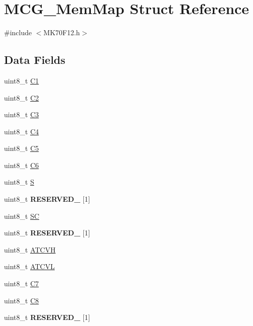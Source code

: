\hypertarget{struct_m_c_g___mem_map}{}\section{M\+C\+G\+\_\+\+Mem\+Map Struct Reference}
\label{struct_m_c_g___mem_map}


{\ttfamily \#include $<$M\+K70\+F12.\+h$>$}

\subsection*{Data Fields}
\begin{DoxyCompactItemize}
\item 
uint8\+\_\+t \hyperlink{struct_m_c_g___mem_map_a433a36d1aeb9d033b502ee263c1495a1}{C1}
\item 
uint8\+\_\+t \hyperlink{struct_m_c_g___mem_map_a7323696b9a1cb6631b8c04ffad3947e5}{C2}
\item 
uint8\+\_\+t \hyperlink{struct_m_c_g___mem_map_a58ca70b30279c98af3471abe38280f01}{C3}
\item 
uint8\+\_\+t \hyperlink{struct_m_c_g___mem_map_a3c5615d70ed3f2d3664de1a8fdbe9983}{C4}
\item 
uint8\+\_\+t \hyperlink{struct_m_c_g___mem_map_a0e385950fe0f38c82eae57eb4ea2aaf3}{C5}
\item 
uint8\+\_\+t \hyperlink{struct_m_c_g___mem_map_ae7f9f9ae65de91e230a236ca4629380c}{C6}
\item 
uint8\+\_\+t \hyperlink{struct_m_c_g___mem_map_a65ee0333e0d5c462c7dd8c2402bf93be}{S}
\item 
\hypertarget{struct_m_c_g___mem_map_a4a2bbf23e6c51743e808ba42e79d6128}{}uint8\+\_\+t {\bfseries R\+E\+S\+E\+R\+V\+E\+D\+\_} \mbox{[}1\mbox{]}\label{struct_m_c_g___mem_map_a4a2bbf23e6c51743e808ba42e79d6128}

\item 
uint8\+\_\+t \hyperlink{struct_m_c_g___mem_map_aeff584aa52340d7c66dc06789ad05310}{S\+C}
\item 
\hypertarget{struct_m_c_g___mem_map_a612b54d367d5589e35fd249f6335f85c}{}uint8\+\_\+t {\bfseries R\+E\+S\+E\+R\+V\+E\+D\+\_} \mbox{[}1\mbox{]}\label{struct_m_c_g___mem_map_a612b54d367d5589e35fd249f6335f85c}

\item 
uint8\+\_\+t \hyperlink{struct_m_c_g___mem_map_a74fee35955b4ec57aa8058bd57a926a8}{A\+T\+C\+V\+H}
\item 
uint8\+\_\+t \hyperlink{struct_m_c_g___mem_map_a913b6fd7776c0377e299fdf0eeb166af}{A\+T\+C\+V\+L}
\item 
uint8\+\_\+t \hyperlink{struct_m_c_g___mem_map_a7be430dafe8d0fddf4dbb83781946201}{C7}
\item 
uint8\+\_\+t \hyperlink{struct_m_c_g___mem_map_a346a8b8c5c2c675e6297aaa1f14798df}{C8}
\item 
\hypertarget{struct_m_c_g___mem_map_a300e685a8aaa660245f6147a328d4766}{}uint8\+\_\+t {\bfseries R\+E\+S\+E\+R\+V\+E\+D\+\_} \mbox{[}1\mbox{]}\label{struct_m_c_g___mem_map_a300e685a8aaa660245f6147a328d4766}


\end{DoxyCompactItemize}
